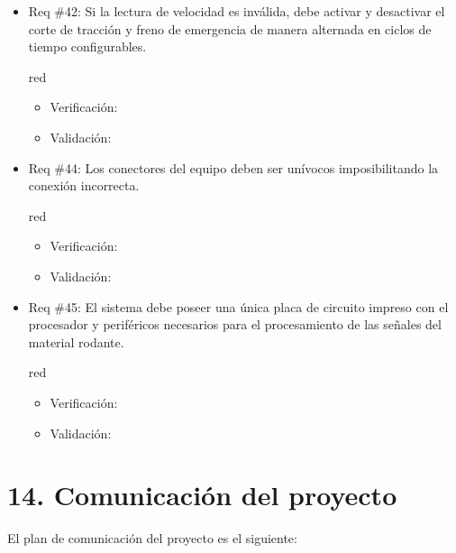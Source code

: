 \documentclass[11pt]{charter}
\begin{document}
\begin{itemize}
\item Req \#42: Si la lectura de velocidad es inválida, debe activar y desactivar el corte de tracción y freno de emergencia de manera alternada en ciclos de tiempo configurables.
\begin{consigna}{red}
\begin{itemize}
  \item Verificación:\\
  \item Validación:\\
\end{itemize}
\end{consigna}

\item Req \#44: Los conectores del equipo deben ser unívocos imposibilitando la conexión incorrecta.
\begin{consigna}{red}
\begin{itemize}
  \item Verificación:\\
  \item Validación:\\
\end{itemize}
\end{consigna}

\item Req \#45: El sistema debe poseer una única placa de circuito impreso con el procesador y periféricos necesarios para el procesamiento de las señales del material rodante.
\begin{consigna}{red}
\begin{itemize}
  \item Verificación:\\
  \item Validación:\\
\end{itemize}
\end{consigna}

\end{itemize}

\newpage

\section{14. Comunicación del proyecto}
\label{sec:comunicaciones}

El plan de comunicación del proyecto es el siguiente:
\end{document}
